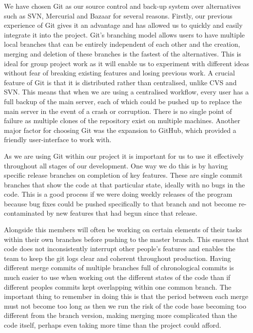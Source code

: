 \documentclass[10pt, a4paper]{article}
\begin{document}
We have chosen Git as our source control and back-up system over alternatives such as SVN, Mercurial and Bazaar for several reasons. Firstly, our previous experience of Git gives it an advantage and has allowed us to quickly and easily integrate it into the project. Git's branching model allows users to have multiple local branches that can be entirely independent of each other and the creation, merging and deletion of these branches is the fastest of the alternatives. This is ideal for group project work as it will enable us to experiment with different ideas without fear of breaking existing features and losing previous work. A crucial feature of Git is that it is distributed rather than centralised, unlike CVS and SVN. This means that when we are using a centralised workflow, every user has a full backup of the main server, each of which could be pushed up to replace the main server in the event of a crash or corruption. There is no single point of failure as multiple clones of the repository exist on multiple machines. Another major factor for choosing Git was the expansion to GitHub, which provided a friendly user-interface to work with. 

As we are using Git within our project it is important for us to use it effectively throughout all stages of our development. One way we do this is by having specific release branches on completion of key features. These are single commit branches that show the code at that particular state, ideally with no bugs in the code. This is a good process if we were doing weekly releases of the program because bug fixes could be pushed specifically to that branch and not become re-contaminated by new features that had begun since that release.

Alongside this members will often be working on certain elements of their tasks within their own branches before pushing to the master branch. This ensures that code does not inconsistently interrupt other people’s features and enables the team to keep the git logs clear and coherent throughout production. Having different merge commits of multiple branches full of chronological commits is much easier to use when working out the different states of the code than if different peoples commits kept overlapping within one common branch. The important thing to remember in doing this is that the period between each merge must not become too long as then we run the risk of the code base becoming too different from the branch version, making merging more complicated than the code itself, perhaps even taking more time than the project could afford.
\end{document}
